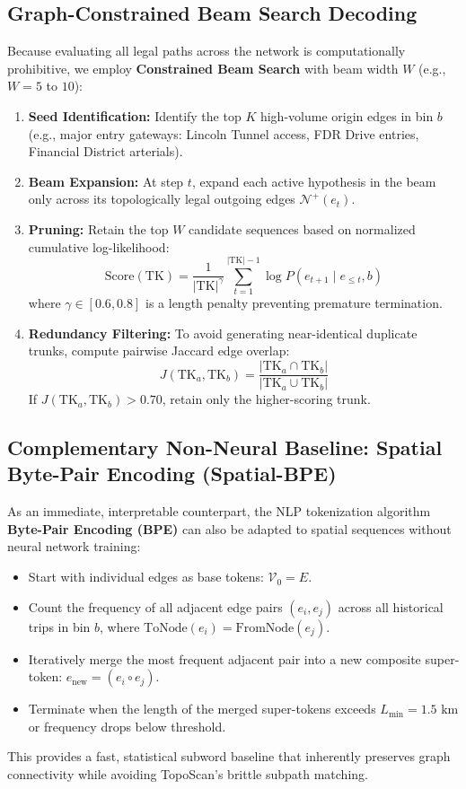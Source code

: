 \documentclass[12pt,a4paper]{article}
\begin{document}
\subsection{Graph-Constrained Beam Search Decoding}
Because evaluating all legal paths across the network is computationally prohibitive, we employ \textbf{Constrained Beam Search} with beam width $W$ (e.g., $W = 5$ to $10$):
\begin{enumerate}
    \item \textbf{Seed Identification:} Identify the top $K$ high-volume origin edges in bin $b$ (e.g., major entry gateways: Lincoln Tunnel access, FDR Drive entries, Financial District arterials).
    \item \textbf{Beam Expansion:} At step $t$, expand each active hypothesis in the beam only across its topologically legal outgoing edges $\mathcal{N}^+(e_t)$.
    \item \textbf{Pruning:} Retain the top $W$ candidate sequences based on normalized cumulative log-likelihood:
    \begin{equation}
    \text{Score}(\text{TK}) = \frac{1}{|\text{TK}|^\gamma} \sum_{t=1}^{|\text{TK}|-1} \log P(e_{t+1} \mid e_{\le t}, b)
    \end{equation}
    where $\gamma \in [0.6, 0.8]$ is a length penalty preventing premature termination.
    \item \textbf{Redundancy Filtering:} To avoid generating near-identical duplicate trunks, compute pairwise Jaccard edge overlap:
    \begin{equation}
    J(\text{TK}_a, \text{TK}_b) = \frac{|\text{TK}_a \cap \text{TK}_b|}{|\text{TK}_a \cup \text{TK}_b|}
    \end{equation}
    If $J(\text{TK}_a, \text{TK}_b) > 0.70$, retain only the higher-scoring trunk.
\end{enumerate}

\subsection{Complementary Non-Neural Baseline: Spatial Byte-Pair Encoding (Spatial-BPE)}
As an immediate, interpretable counterpart, the NLP tokenization algorithm \textbf{Byte-Pair Encoding (BPE)} can also be adapted to spatial sequences without neural network training:
\begin{itemize}
    \item Start with individual edges as base tokens: $\mathcal{V}_0 = E$.
    \item Count the frequency of all adjacent edge pairs $(e_i, e_j)$ across all historical trips in bin $b$, where $\text{ToNode}(e_i) = \text{FromNode}(e_j)$.
    \item Iteratively merge the most frequent adjacent pair into a new composite super-token: $e_{\text{new}} = (e_i \circ e_j)$.
    \item Terminate when the length of the merged super-tokens exceeds $L_{\min} = 1.5\text{ km}$ or frequency drops below threshold.
\end{itemize}
This provides a fast, statistical subword baseline that inherently preserves graph connectivity while avoiding TopoScan's brittle subpath matching.
\end{document}
